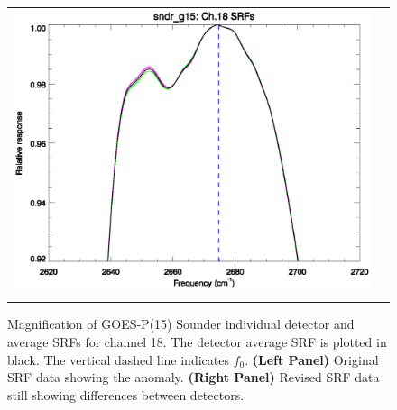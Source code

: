 \begin{figure}[htp]
\begin{tabular}{c c}
    \includegraphics[scale=0.5,trim=0 40 0 0]{graphics/zoom_anomaly/revised/sndr_g15.ch18.srf.eps} \\\\
  \end{tabular}
  \caption{Magnification of GOES-P(15) Sounder individual detector and average SRFs for channel 18. The detector average SRF is plotted in black. The vertical dashed line indicates $f_0$. \textbf{(Left Panel)} Original SRF data showing the anomaly. \textbf{(Right Panel)} Revised SRF data still showing differences between detectors.}
  \label{fig:sndr_g15.ch18.anomaly}
\end{figure}

